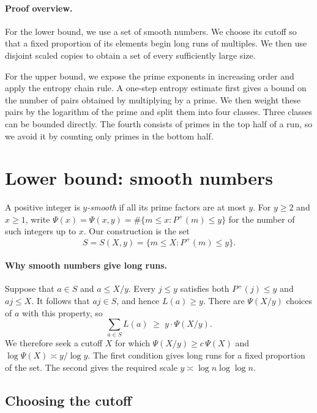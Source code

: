 \documentclass[11pt]{article}
\theoremstyle{remark}
\newcommand{\Pplus}{P^{+}}
\begin{document}
\paragraph{Proof overview.}
For the lower bound, we use a set of smooth numbers.
We choose its cutoff so that a fixed proportion of its elements begin long runs of multiples.
We then use disjoint scaled copies to obtain a set of every sufficiently large size.

For the upper bound, we expose the prime exponents in increasing order and apply the entropy chain rule.
A one-step entropy estimate first gives a bound on the number of pairs obtained by multiplying by a prime.
We then weight these pairs by the logarithm of the prime and split them into four classes.
Three classes can be bounded directly.
The fourth consists of primes in the top half of a run, so we avoid it by counting only primes in the bottom half.

\section{Lower bound: smooth numbers}

A positive integer is \emph{$y$-smooth} if all its prime factors are at most $y$.
For $y\ge 2$ and $x\ge1$, write $\Psi(x)=\Psi(x,y)=\#\{m\le x:\Pplus(m)\le y\}$ for the number of such integers up to $x$.
Our construction is the set
\[
  S = S(X,y) = \{m\le X : \Pplus(m)\le y\}.
\]

\paragraph{Why smooth numbers give long runs.}
Suppose that $a\in S$ and $a\le X/y$.
Every $j\le y$ satisfies both $\Pplus(j)\le y$ and $aj\le X$.
It follows that $aj\in S$, and hence $L(a)\ge y$.
There are $\Psi(X/y)$ choices of $a$ with this property, so
\begin{equation}\label{eq:lb-basic}
  \sum_{a\in S}L(a) \;\ge\; y\cdot \Psi(X/y).
\end{equation}
We therefore seek a cutoff $X$ for which $\Psi(X/y)\ge c\,\Psi(X)$ and $\log\Psi(X)\asymp y/\log y$.
The first condition gives long runs for a fixed proportion of the set.
The second gives the required scale $y\asymp\log n\log\log n$.

\subsection{Choosing the cutoff}
\end{document}
